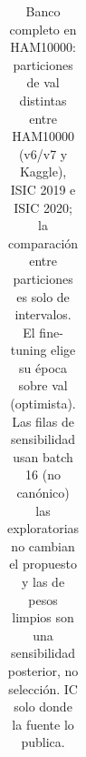 \begin{table}[ht]
\begin{tabular}{@{}lllllrrrrrrrrr@{}}
\bottomrule
\end{tabular}
\caption{Banco completo en HAM10000: particiones de val distintas entre HAM10000 (v6/v7 y Kaggle), ISIC 2019 e ISIC 2020; la comparación entre particiones es solo de intervalos. El fine-tuning elige su época sobre val (optimista). Las filas de sensibilidad usan batch 16 (no canónico) las exploratorias no cambian el propuesto y las de pesos limpios son una sensibilidad posterior, no selección. IC solo donde la fuente lo publica.}
\label{tab:bench-ham10000}
\end{table}
